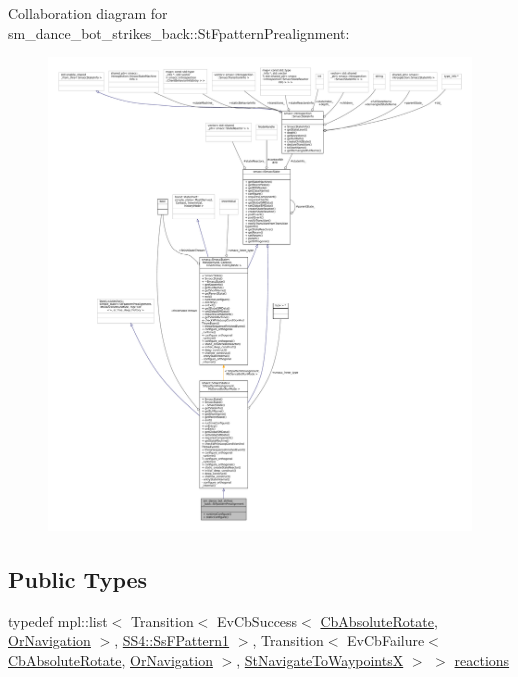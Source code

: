 Collaboration diagram for sm\+\_\+dance\+\_\+bot\+\_\+strikes\+\_\+back\+:\+:St\+Fpattern\+Prealignment\+:
\nopagebreak
\begin{figure}[H]
\begin{center}
\leavevmode
\includegraphics[width=350pt]{structsm__dance__bot__strikes__back_1_1StFpatternPrealignment__coll__graph}
\end{center}
\end{figure}
\subsection*{Public Types}
\begin{DoxyCompactItemize}
\item 
typedef mpl\+::list$<$ Transition$<$ Ev\+Cb\+Success$<$ \hyperlink{classcl__move__base__z_1_1CbAbsoluteRotate}{Cb\+Absolute\+Rotate}, \hyperlink{classsm__dance__bot__strikes__back_1_1OrNavigation}{Or\+Navigation} $>$, \hyperlink{structsm__dance__bot__strikes__back_1_1SS4_1_1SsFPattern1}{S\+S4\+::\+Ss\+F\+Pattern1} $>$, Transition$<$ Ev\+Cb\+Failure$<$ \hyperlink{classcl__move__base__z_1_1CbAbsoluteRotate}{Cb\+Absolute\+Rotate}, \hyperlink{classsm__dance__bot__strikes__back_1_1OrNavigation}{Or\+Navigation} $>$, \hyperlink{structsm__dance__bot__strikes__back_1_1StNavigateToWaypointsX}{St\+Navigate\+To\+WaypointsX} $>$ $>$ \hyperlink{structsm__dance__bot__strikes__back_1_1StFpatternPrealignment_a0c187659c7f748fbf526e692e9e86430}{reactions}
\end{DoxyCompactItemize}
